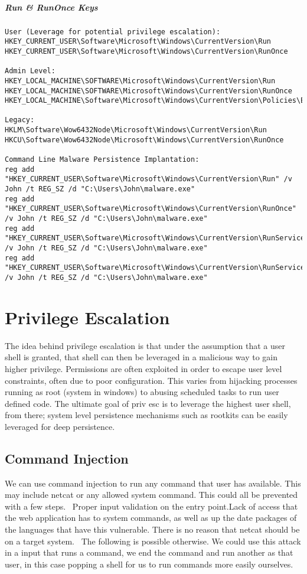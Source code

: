 \subparagraph{Run & RunOnce Keys}
\begin{lstlisting}[label=RegistryRun,caption=Registry Run Locations] 
User (Leverage for potential privilege escalation):
HKEY_CURRENT_USER\Software\Microsoft\Windows\CurrentVersion\Run
HKEY_CURRENT_USER\Software\Microsoft\Windows\CurrentVersion\RunOnce

Admin Level:
HKEY_LOCAL_MACHINE\SOFTWARE\Microsoft\Windows\CurrentVersion\Run
HKEY_LOCAL_MACHINE\SOFTWARE\Microsoft\Windows\CurrentVersion\RunOnce
HKEY_LOCAL_MACHINE\Software\Microsoft\Windows\CurrentVersion\Policies\Explorer\Run

Legacy:
HKLM\Software\Wow6432Node\Microsoft\Windows\CurrentVersion\Run
HKCU\Software\Wow6432Node\Microsoft\Windows\CurrentVersion\RunOnce

Command Line Malware Persistence Implantation:
reg add "HKEY_CURRENT_USER\Software\Microsoft\Windows\CurrentVersion\Run" /v John /t REG_SZ /d "C:\Users\John\malware.exe"
reg add "HKEY_CURRENT_USER\Software\Microsoft\Windows\CurrentVersion\RunOnce" /v John /t REG_SZ /d "C:\Users\John\malware.exe"
reg add "HKEY_CURRENT_USER\Software\Microsoft\Windows\CurrentVersion\RunServices" /v John /t REG_SZ /d "C:\Users\John\malware.exe"
reg add "HKEY_CURRENT_USER\Software\Microsoft\Windows\CurrentVersion\RunServicesOnce" /v John /t REG_SZ /d "C:\Users\John\malware.exe"

\end{lstlisting}

\citep{registryRun}

\section{Privilege Escalation}
The idea behind privilege escalation is that under the assumption that a user shell is granted, that shell can then be leveraged in a malicious way to gain higher privilege.
Permissions are often exploited in order to escape user level constraints, often due to poor configuration. This varies from hijacking processes running as root (system in windows) to
abusing scheduled tasks to run user defined code. The ultimate goal of priv esc is to leverage the highest user shell, from there; system level persistence mechanisms such as rootkits can be easily
leveraged for deep persistence. 

\subsection{Command Injection}
We can use command injection to run any command that user has available. This may include netcat or any allowed system command. This could all be prevented with a few steps. 
Proper input validation on the entry point.Lack of access that the web application has to system commands, as well as up the date packages of the languages that have this vulnerable. There is no reason that netcat should be on a target system. 
The following is possible otherwise. We could use this attack in a input that runs a command, we end the command and run another as that user, in this case popping a shell for us to run commands more easily ourselves.

